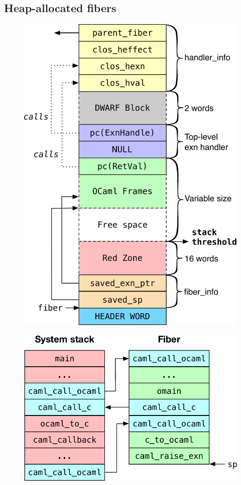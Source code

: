 \documentclass[sigplan,10pt,review,anonymous]{acmart}\settopmatter{printfolios=true,printccs=false,printacmref=false}
\begin{document}
\subsection{Heap-allocated fibers}

\begin{figure}
\begin{minipage}{0.35\linewidth}
  \centering
  \includegraphics[scale=0.45]{figures/fiber}
  \label{fig:fiber}
\end{minipage}
\begin{minipage}{0.64\linewidth}
  \begin{minipage}{\linewidth}
    \centering
    \includegraphics[scale=0.4]{figures/multicore_stack}

\end{minipage}
\end{minipage}
\end{figure}
\end{document}
